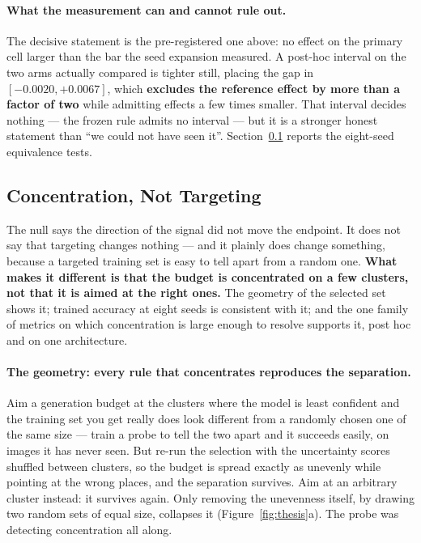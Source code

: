 \documentclass{article}
\begin{document}
\paragraph{What the measurement can and cannot rule out.} The decisive statement is the
pre-registered one above: no effect on the primary cell larger than the bar the seed expansion
measured. A post-hoc interval on the two arms actually compared is tighter still,
placing the gap in $[-0.0020, +0.0067]$, which \textbf{excludes the reference effect by more than a
factor of two} while admitting effects a few times smaller. That interval decides nothing --- the
frozen rule admits no interval --- but it is a stronger honest statement than ``we could not have
seen it''. Section~\ref{sec:concentration} reports the eight-seed equivalence tests.

\subsection{Concentration, Not Targeting}
\label{sec:concentration}
The null says the direction of the signal did not move the endpoint. It does not say that targeting
changes nothing --- and it plainly does change something, because a targeted training set is easy to
tell apart from a random one. \textbf{What makes it different is that the budget is concentrated on
a few clusters, not that it is aimed at the right ones.} The geometry of the selected set shows it;
trained accuracy at eight seeds is consistent with it; and the one family of metrics on which
concentration is large enough to resolve supports it, post hoc and on one architecture.

\paragraph{The geometry: every rule that concentrates reproduces the separation.} Aim a generation
budget at the clusters where the model is least confident and the training set you get really does
look different from a randomly chosen one of the same size --- train a probe to tell the two apart
and it succeeds easily, on images it has never seen. But re-run the selection with the uncertainty
scores shuffled between clusters, so the budget is spread exactly as unevenly while pointing at the
wrong places, and the separation survives. Aim at an arbitrary cluster instead: it survives again.
Only removing the unevenness itself, by drawing two random sets of equal size, collapses it
(Figure~\ref{fig:thesis}a). The probe was detecting concentration all along.
\end{document}
